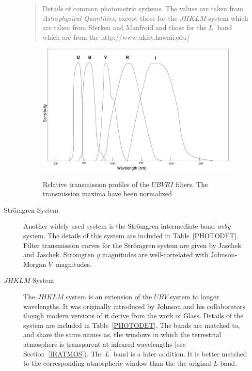 \documentclass[twoside,11pt,nolof]{starlink}
\begin{document}
\begin{description}
\begin{table}[htbp]
  \begin{quote}
  \caption[Details of common photometric systems.]{Details
   of common photometric systems.  The values are taken from \textit{Astrophysical Quantities}\/\cite{AQ3}, except those for the $JHKLM$
   system which are taken from Sterken and Manfroid\cite{STERKEN92} and
   those for the $L^{\prime}$ band which are from the
   {http://www.ukirt.hawaii.edu/}
  \label{PHOTODET} }
  \end{quote}

  \end{table}

  \begin{figure}[htbp]
     \centering
     \includegraphics[width=\textwidth]{sc6_ubv}
     \begin{quote}
     \caption{Relative transmission profiles of the $UBVRI$ filters.
      The transmission maxima have been normalized
     \label{UBV} }
     \end{quote}
  \end{figure}

  \item[Str\"{o}mgren System] Another widely used system is the Str\"{o}mgren
   intermediate-band \textit{uvby}\, system\cite{STROMGREM63, STROMGREM66}.  The
   details of this system are included in Table~\ref{PHOTODET}.  Filter
   transmission curves for the Str\"{o}mgren system are given by Jaschek and
   Jaschek\cite{JASCHEK87}.  Str\"{o}mgren $y$ magnitudes are well-correlated
   with Johnson-Morgan $V$\, magnitudes.

  \item[$JHKLM$ System] The $JHKLM$ system is an extension of the
   $UBV$ system to longer wavelengths.  It was originally introduced by
   Johnson and his collaborators though modern versions of it derive
   from the work of Glass\cite{GLASS74}.  Details of the system are
   included in Table~\ref{PHOTODET}.  The bands are matched to, and share
   the same names as, the windows in which the terrestrial atmosphere is
   transparent at infrared wavelengths (see Section~\ref{IRATMOS}).  The
   $L^{\prime}$ band is a later addition.  It is better matched to the
   corresponding atmospheric window than the the original $L$ band.


\end{description}
\end{document}

